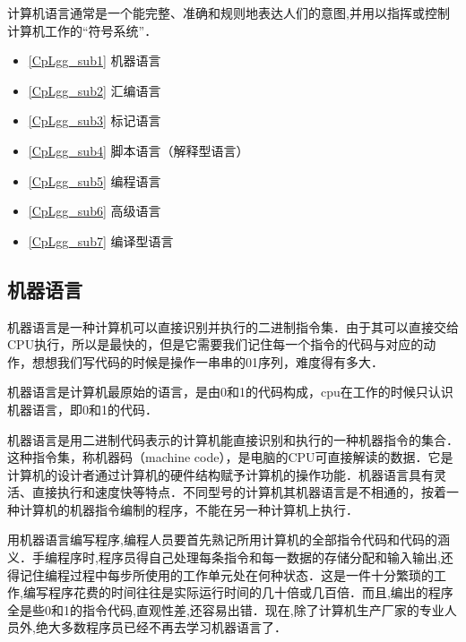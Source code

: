 
\begin{issues}
\issueDraft
\issueTODO
\end{issues}

计算机语言通常是一个能完整、准确和规则地表达人们的意图,并用以指挥或控制计算机工作的“符号系统”．

\begin{itemize}
\item \autoref{CpLgg_sub1} 机器语言

\item \autoref{CpLgg_sub2} 汇编语言

\item \autoref{CpLgg_sub3} 标记语言

\item \autoref{CpLgg_sub4} 脚本语言（解释型语言）

\item \autoref{CpLgg_sub5} 编程语言

\item \autoref{CpLgg_sub6} 高级语言

\item \autoref{CpLgg_sub7} 编译型语言
\end{itemize}

\subsection{机器语言}\label{CpLgg_sub1}

机器语言是一种计算机可以直接识别并执行的二进制指令集．由于其可以直接交给CPU执行，所以是最快的，但是它需要我们记住每一个指令的代码与对应的动作，想想我们写代码的时候是操作一串串的01序列，难度得有多大．

机器语言是计算机最原始的语言，是由0和1的代码构成，cpu在工作的时候只认识机器语言，即0和1的代码．

机器语言是用二进制代码表示的计算机能直接识别和执行的一种机器指令的集合．这种指令集，称机器码（machine code），是电脑的CPU可直接解读的数据．它是计算机的设计者通过计算机的硬件结构赋予计算机的操作功能．机器语言具有灵活、直接执行和速度快等特点．不同型号的计算机其机器语言是不相通的，按着一种计算机的机器指令编制的程序，不能在另一种计算机上执行．

用机器语言编写程序,编程人员要首先熟记所用计算机的全部指令代码和代码的涵义．手编程序时,程序员得自己处理每条指令和每一数据的存储分配和输入输出,还得记住编程过程中每步所使用的工作单元处在何种状态．这是一件十分繁琐的工作,编写程序花费的时间往往是实际运行时间的几十倍或几百倍．而且,编出的程序全是些0和1的指令代码,直观性差,还容易出错．现在,除了计算机生产厂家的专业人员外,绝大多数程序员已经不再去学习机器语言了．

